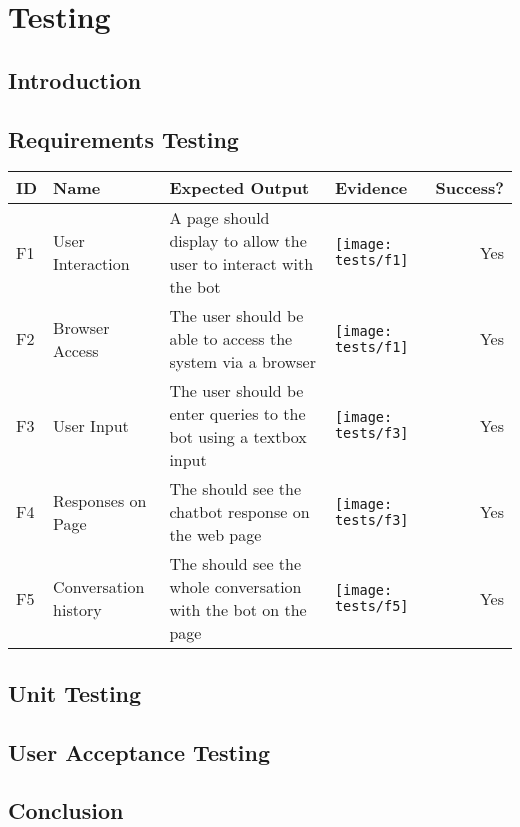 \chapter{Testing}
\label{ch:testing}
\section{Introduction}
\newpage

\begin{landscape}
	\section{Requirements Testing}
	\begin{tabularx}{\hsize}{lllXr}
		\toprule
		ID & Name & Expected Output & Evidence & Success? \\
		\midrule
		F1 & User Interaction 
		& A page should display to allow the user to interact with the bot
		& \texttt{[image: tests/f1]} & Yes \\
		\midrule
		F2 & Browser Access
		& The user should be able to access the system via a browser
		& \texttt{[image: tests/f1]} & Yes \\
		\midrule
		F3 & User Input
		& The user should be enter queries to the bot using a textbox input
		& \texttt{[image: tests/f3]} & Yes \\
		\bottomrule
		F4 & Responses on Page
		& The should see the chatbot response on the web page
		& \texttt{[image: tests/f3]} & Yes \\
		\bottomrule
		F5 & Conversation history
		& The should see the whole conversation with the bot on the page
		& \texttt{[image: tests/f5]} & Yes \\
		\bottomrule
	\end{tabularx}
\end{landscape}


\newpage
\section{Unit Testing}
\section{User Acceptance Testing}
\section{Conclusion}